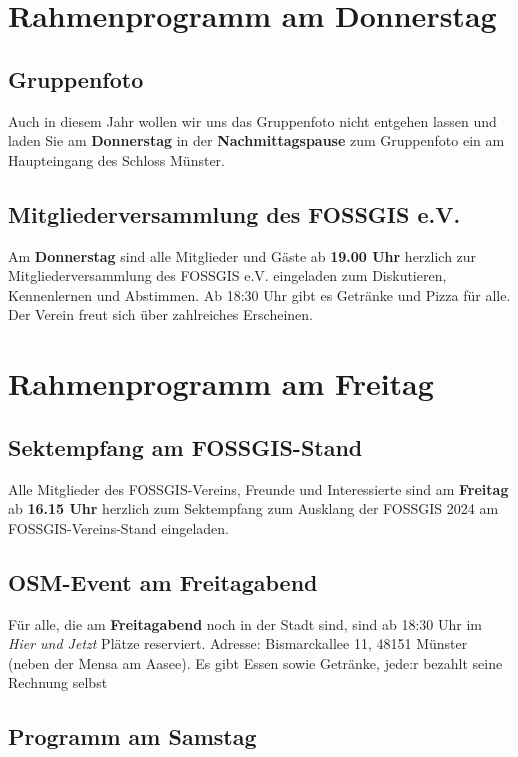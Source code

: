 \section*{Rahmenprogramm am Donnerstag}
\subsection*{Gruppenfoto}
Auch in diesem Jahr wollen wir uns das Gruppenfoto nicht entgehen lassen und laden Sie am {\bfseries Donnerstag} in der {\bfseries Nachmittagspause} zum Gruppenfoto ein am Haupteingang des Schloss Münster.

\subsection*{Mitgliederversammlung des FOSSGIS e.V.}
Am {\bfseries Donnerstag} sind alle Mitglieder und Gäste ab {\bfseries 19.00 Uhr} herzlich zur Mitgliederversammlung des FOSSGIS e.V. eingeladen zum Diskutieren, Kennenlernen und Abstimmen. Ab 18:30 Uhr
gibt es Getränke und Pizza für alle. Der Verein freut sich über zahlreiches Erscheinen.

\newpage
\section*{Rahmenprogramm am Freitag}

\subsection*{Sektempfang am FOSSGIS-Stand}
Alle Mitglieder des FOSSGIS-Vereins, Freunde und Interessierte sind am {\bfseries Freitag} ab {\bfseries 16.15 Uhr} herzlich zum Sektempfang zum Ausklang der FOSSGIS 2024 am FOSSGIS-Vereins-Stand eingeladen.

\subsection*{OSM-Event am Freitagabend}
Für alle, die am {\bfseries Freitagabend} noch in der Stadt sind, sind  ab 18:30 Uhr im {\em Hier und Jetzt} Plätze reserviert. Adresse: Bismarck\-allee 11, 48151 Münster (neben der Mensa am Aasee). Es gibt Essen sowie Getränke, jede:r bezahlt seine Rechnung selbst

\newpage
\subsection*{Programm am Samstag}

